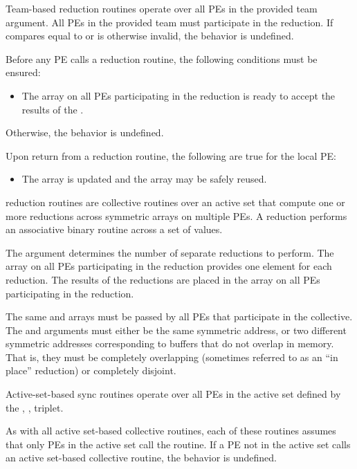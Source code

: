 \begin{apidefinition}
{    Team-based reduction routines operate over all \acp{PE} in the provided team argument. All
    \acp{PE} in the provided team must participate in the reduction.
    If  compares equal to  or is
    otherwise invalid, the behavior is undefined.

    Before any \ac{PE} calls a reduction routine, the following conditions must be ensured:
    \begin{itemize}
    \item The \dest{} array on all \acp{PE} participating in the reduction
      is ready to accept the results of the .
    \end{itemize}
    Otherwise, the behavior is undefined.
    
    Upon return from a reduction routine, the following are true for the local
    \ac{PE}:
    \begin{itemize}
    \item The \dest{} array is updated and the \source{} array may be safely reused.
    \end{itemize}

\begin{DeprecateBlock}
    \openshmem reduction routines are collective routines over an active set 
	that compute one or more reductions across symmetric
    arrays on multiple \acp{PE}.  A reduction performs an associative binary routine
    across a set of values.

    The  argument determines the number of separate reductions to
    perform.  The \source{} array on all \acp{PE} participating in the reduction
    provides one element for each reduction.  The results of the reductions are placed in the
    \dest{} array on all \acp{PE} participating in the reduction.

    The same \source{} and \dest{} arrays must be passed by all PEs that
    participate in the collective.
    The \source{} and \dest{} arguments must either be the same symmetric
    address, or two different symmetric addresses corresponding to buffers that
    do not overlap in memory. That is, they must be completely overlapping (sometimes referred to as an ``in place'' reduction) or
    completely disjoint.

    Active-set-based sync routines operate over all \acp{PE} in the active set
    defined by the , ,  triplet.

    As with all active set-based collective routines,
    each of these routines assumes
    that only \acp{PE} in the active set call the routine.  If a \ac{PE} not in
    the active set calls an active set-based collective routine,
    the behavior is undefined.


\end{DeprecateBlock}}
\end{apidefinition}
